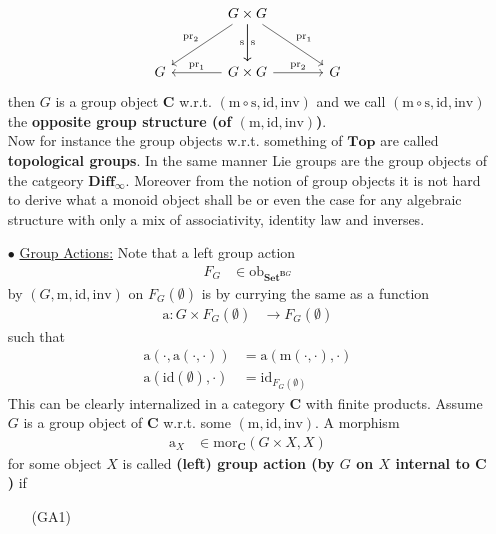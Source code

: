 \begin{exa}
\begin{enumerate}
\[\begin{tikzcd}[sep=large]
  &
  G
  \times
  G
  \arrow{dr}{\mathrm{pr}_{1}}
  \arrow{d}{\mathrm{s}}
  \arrow[swap]{d}{\mathrm{s}}
  \arrow[swap]{dl}{\mathrm{pr}_{2}}
  &
  \\
  G
  &
  G
  \times
  G
  \arrow{r}{\mathrm{pr}_{2}}
  \arrow[swap]{l}{\mathrm{pr}_{1}}
  &
  G
\end{tikzcd}
\]
then $G$ is a group object $\mathbf{C}$ w.r.t. $(\mathrm{m} \circ \mathrm{s},\mathrm{id},\mathrm{inv})$ and we call $(\mathrm{m} \circ \mathrm{s},\mathrm{id},\mathrm{inv})$ the \textbf{opposite group structure (of $(\mathrm{m},\mathrm{id},\mathrm{inv})$)}.
\\
Now for instance the group objects w.r.t. something of $\mathbf{Top}$ are called \textbf{topological groups}. In the same manner Lie groups are the group objects of the catgeory $\mathbf{Diff}_{\infty}$. Moreover from the notion of group objects it is not hard to derive what a monoid object shall be or even the case for any algebraic structure with only a mix of associativity, identity law and inverses.
\item[$\bullet$]
\underline{Group Actions:}
Note that a left group action
\begin{align*}
  F_{G}
  &\in
  \mathrm{ob}_{\mathbf{Set}^{\mathbf{B}G}}
\end{align*}
by $(G,\mathrm{m},\mathrm{id},\mathrm{inv})$ on $F_{G}(\emptyset)$ is by currying the same as a function
\begin{align*}
  \mathrm{a}
  \colon
  G
  \times
  F_{G}(\emptyset)
  &\rightarrow
  F_{G}(\emptyset)
\end{align*}
such that
\begin{align*}
  \mathrm{a}
  \left(
    \cdot,
    \mathrm{a}(\cdot,\cdot)
  \right)
  &=
  \mathrm{a}
  \left(
    \mathrm{m}(\cdot,\cdot),
    \cdot
  \right)
  \\
  \mathrm{a}(\mathrm{id}(\emptyset),\cdot)
  &=
  \mathrm{id}_{F_{G}(\emptyset)}
\end{align*}
This can be clearly internalized in a category $\mathbf{C}$ with finite products. Assume $G$ is a group object of $\mathbf{C}$ w.r.t. some $(\mathrm{m},\mathrm{id},\mathrm{inv})$. A morphism
\begin{align*}
  \mathrm{a}_{X}
  &\in
  \mathrm{mor}_{\mathbf{C}}
  \left(
    G
    \times
    X,
    X
  \right)
\end{align*}
for some object $X$ is called \textbf{(left) group action (by $G$ on $X$ internal to $\mathbf{C}$)} if
\begin{enumerate}
\item[(GA1)]

\end{enumerate}
\end{enumerate}
\end{exa}
